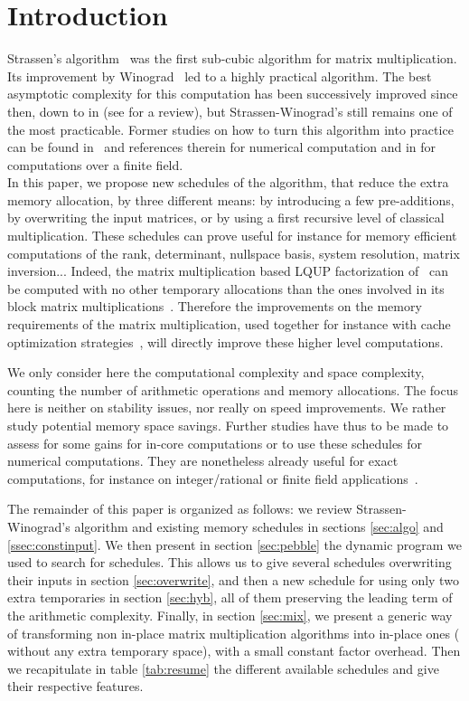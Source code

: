 \documentclass{article}
\begin{document}
\section{Introduction}
Strassen's algorithm~\cite{Strassen:1969:GENO} was the
first sub-cubic algorithm for matrix multiplication.
Its improvement by Winograd~\cite{Winograd:1971:tbtmm}
led to a highly practical algorithm.
The best asymptotic complexity for this computation has been
successively improved since then, down to 
in \cite{Coppersmith:1990:MMAP} (see
\cite{Bini:1994:PMC-FA,burgisser:1997} for a review), but
Strassen-Winograd's
still remains one of the most practicable.
Former studies on how to turn this algorithm into practice can be found
in~\cite{bailey:603,Huss-Lederman:1996:ISA, Huss-Lederman:1996:mai,
  Douglas:1994:gemmw}
and references therein for numerical computation and in
\cite{Pernet:2001:Winograd, Dumas:2002:FFLAS}
for computations over a finite field.\\
In this paper, we propose new schedules of the algorithm, that
reduce the
extra memory allocation, by three different means:
by introducing a few pre-additions, by overwriting the input matrices, or by using a first recursive level of classical multiplication.
These schedules can prove useful for instance for memory
efficient computations of the rank,
determinant, nullspace basis, system resolution, matrix inversion...
Indeed, the matrix multiplication based LQUP factorization of~\cite{Ibarra:1982:LSP} can be
computed with no other temporary allocations than the ones involved in
its block matrix
multiplications~\cite{JeannerodPernet:2007:LQUP}. Therefore the
improvements on
the memory requirements of the matrix multiplication, used together
for instance with cache optimization strategies~\cite{Bader:2006:comm}, will directly
improve these higher level computations.

We only consider here the computational complexity and space
complexity, counting the number of arithmetic operations and memory
allocations.
The focus here is neither on stability issues, nor really on speed
improvements. We rather study potential memory space savings.
Further studies have thus to be made to assess for some gains for
in-core computations or to use these schedules
for numerical computations.
They are nonetheless already useful for exact computations, for instance on
integer/rational or finite field
applications~\cite{Dumas:2004:FFPACK,Laderman:1992:PAA}. 

The remainder of this paper is organized as follows: we review Strassen-Winograd's algorithm and existing memory schedules
in sections \ref{sec:algo} and \ref{ssec:constinput}. We then present in
section \ref{sec:pebble} the dynamic program we used to search for
schedules. This allows us to give several schedules overwriting their inputs in
section \ref{sec:overwrite}, and then a new schedule for  using only two extra temporaries in section \ref{sec:hyb}, all
of them preserving the leading term of the arithmetic complexity. 
Finally, in section \ref{sec:mix}, we present a generic way of transforming non in-place matrix
multiplication algorithms into in-place ones (\ie{} without any extra
temporary space), with a small constant
factor overhead. Then we recapitulate in table \ref{tab:resume} the
different available schedules and give their respective features.
\end{document}
